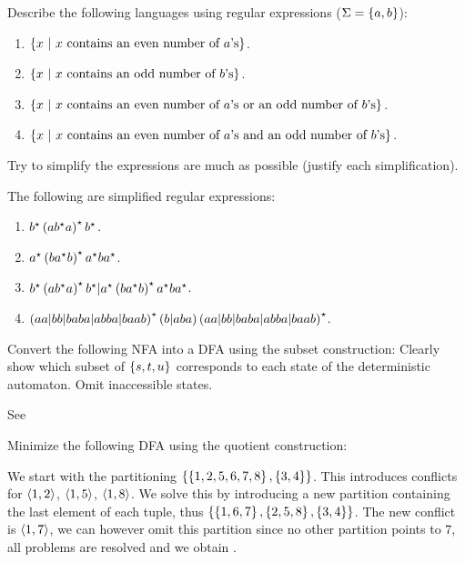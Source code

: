 \documentclass{article}
\begin{document}
\begin{exercise}
Describe the following languages using regular expressions ($\Sigma=\left\{ a,b \right\}$):
\begin{enumerate}
 \item $\left\{ x\ |\ \mbox{$x$ contains an even number of $a$'s} \right\}$.
 \item $\left\{ x\ |\ \mbox{$x$ contains an odd number of $b$'s} \right\}$.
 \item $\left\{ x\ |\ \mbox{$x$ contains an even number of $a$'s or an odd number of $b$’s} \right\}$.
 \item $\left\{ x\ |\ \mbox{$x$ contains an even number of $a$'s and an odd number of $b$’s} \right\}$.
\end{enumerate}
Try to simplify the expressions are much as possible (justify each simplification).
\begin{answer}
The following are simplified regular expressions:
\begin{enumerate}
 \item $b^{\star}\left( ab^{\star}a \right)^{\star}b^{\star}$.
 \item $a^{\star}\left( ba^{\star}b \right)^{\star}a^{\star}ba^{\star}$.
 \item $b^{\star}\left( ab^{\star}a \right)^{\star}b^{\star}|a^{\star}\left( ba^{\star}b \right)^{\star}a^{\star}ba^{\star}$.
 \item $\left( aa|bb|baba|abba|baab \right)^{\star}\left( b|aba \right)\left( aa|bb|baba|abba|baab \right)^{\star}$.
\end{enumerate}
\end{answer}
\end{exercise}
\begin{exercise}
Convert the following NFA into a DFA using the subset construction:
Clearly show which subset of $\left\{ s,t,u \right\}$ corresponds to each state of the deterministic automaton. Omit inaccessible states.
\begin{answer}See 
\end{answer}
\end{exercise}
\begin{exercise}
Minimize the following DFA using the quotient construction:
\begin{answer}
We start with the partitioning $\left\{ \left\{ 1,2,5,6,7,8 \right\},\left\{ 3,4 \right\} \right\}$. This introduces conflicts for $\left\langle 1,2 \right\rangle$, $\left\langle 1,5 \right\rangle$, $\left\langle 1,8 \right\rangle$. We solve this by introducing a new partition containing the last element of each tuple, thus $\left\{ \left\{ 1,6,7 \right\},\left\{ 2,5,8 \right\},\left\{ 3,4 \right\} \right\}$. The new conflict is $\left\langle 1,7 \right\rangle$, we can however omit this partition since no other partition points to $7$, all problems are resolved and we obtain .
\end{answer}
\end{exercise}
\end{document}

